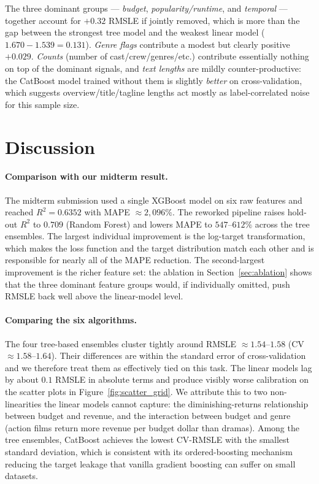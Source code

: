 \documentclass[10pt,a4paper]{article}
\begin{document}
The three dominant groups — \emph{budget}, \emph{popularity/runtime}, and
\emph{temporal} — together account for $+0.32$ RMSLE if jointly removed, which
is more than the gap between the strongest tree model and the weakest linear
model ($1.670 - 1.539 = 0.131$). \emph{Genre flags} contribute a modest but
clearly positive $+0.029$. \emph{Counts} (number of cast/crew/genres/etc.)
contribute essentially nothing on top of the dominant signals, and
\emph{text lengths} are mildly counter-productive: the CatBoost model trained
without them is slightly \emph{better} on cross-validation, which suggests
overview/title/tagline lengths act mostly as label-correlated noise for this
sample size.

\section{Discussion}

\paragraph{Comparison with our midterm result.} The midterm submission used
a single XGBoost model on six raw features and reached $R^{2} = 0.6352$ with
MAPE $\approx 2{,}096\%$. The reworked pipeline raises hold-out $R^{2}$ to
$0.709$ (Random Forest) and lowers MAPE to $547$--$612\%$ across the tree
ensembles. The largest individual improvement is the log-target transformation,
which makes the loss function and the target distribution match each other and
is responsible for nearly all of the MAPE reduction. The second-largest
improvement is the richer feature set: the ablation in
Section~\ref{sec:ablation} shows that the three dominant feature groups would,
if individually omitted, push RMSLE back well above the linear-model level.

\paragraph{Comparing the six algorithms.} The four tree-based ensembles cluster
tightly around RMSLE $\approx 1.54$--$1.58$ (CV $\approx 1.58$--$1.64$). Their
differences are within the standard error of cross-validation and we therefore
treat them as effectively tied on this task. The linear models lag by about
$0.1$ RMSLE in absolute terms and produce visibly worse calibration on the
scatter plots in Figure~\ref{fig:scatter_grid}. We attribute this to two
non-linearities the linear models cannot capture: the diminishing-returns
relationship between budget and revenue, and the interaction between budget
and genre (action films return more revenue per budget dollar than dramas).
Among the tree ensembles, CatBoost achieves the lowest CV-RMSLE with the
smallest standard deviation, which is consistent with its ordered-boosting
mechanism reducing the target leakage that vanilla gradient boosting can suffer
on small datasets.
\end{document}
